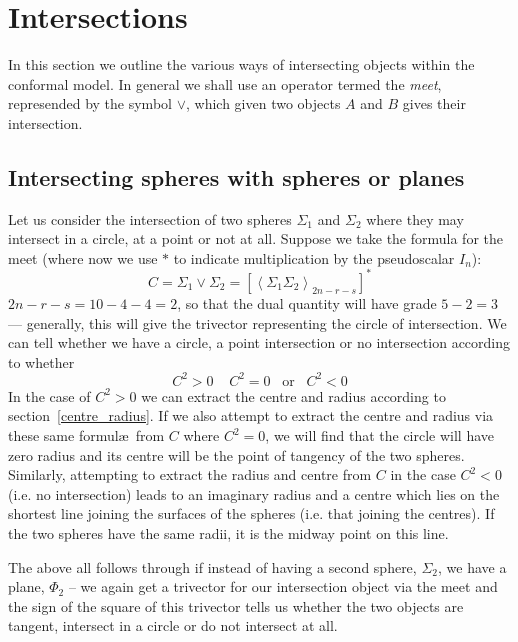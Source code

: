 \section{Intersections}

In this section we outline the various ways of intersecting
objects within the conformal model. In general we shall
use an operator termed the \emph{meet}\cite{hestenes}, represended
by the symbol $\vee$, which given two objects $A$ and $B$
gives their intersection.

\subsection{Intersecting spheres with spheres or planes}

Let us consider the intersection of two spheres $\Sigma_1$ and
$\Sigma_2$ where they may intersect in a circle, at a point or not
at all. Suppose we take the formula for the meet\cite{GA:llw} (where now we use
$*$ to indicate multiplication by the pseudoscalar $I_n$):
%
\begin{equation}
C = \Sigma_1 \vee \Sigma_2 = \left[\left< \Sigma_1 \Sigma_2
\right>_{2n-r-s}\right]^*
\end{equation}
%
$2n-r-s = 10-4-4=2$, so that the dual quantity will have
grade $5-2=3$ --- generally, this will give the trivector
representing the circle of intersection. We can tell
whether we have a circle, a point intersection or no
intersection according to whether
%
\begin{equation}
C^2 >0 \;\;\;\; C^2 = 0 \;\;\;\mbox{or}\;\;\; C^2<0
\end{equation}
%
In the case of $C^2>0$ we can extract the centre and radius
according to section~\ref{centre_radius}. If we also attempt to
extract the centre and radius via these same formul\ae\ from $C$
where $C^2=0$, we will find that the circle will have zero radius
and its centre will be the point of tangency of the two spheres.
Similarly, attempting to extract the radius and centre from $C$ in
the case $C^2<0$ (i.e. no intersection) leads to an imaginary
radius and a centre which lies on the shortest line joining the
surfaces of the spheres (i.e. that joining the centres). If the
two spheres have the same radii, it is the midway point on this
line.

The above all follows through if instead of having a
second sphere, $\Sigma_2$, we have a plane, $\Phi_2$ -- we again get a
trivector for our intersection object via the meet and the sign of the square
of this trivector tells us whether the two objects are tangent, intersect in a
circle or do not intersect at all.

